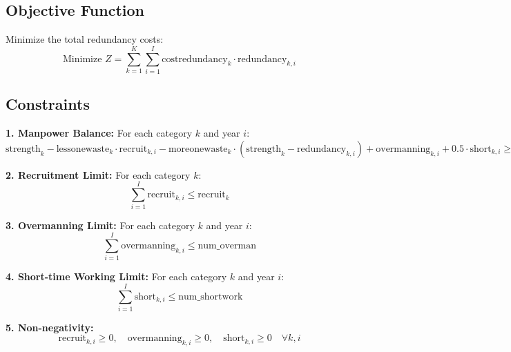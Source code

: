 \documentclass{article}
\begin{document}
\subsection*{Objective Function}
Minimize the total redundancy costs:
\[
\text{Minimize } Z = \sum_{k=1}^{K} \sum_{i=1}^{I} \text{costredundancy}_{k} \cdot \text{redundancy}_{k, i}
\]

\subsection*{Constraints}
\textbf{1. Manpower Balance:}
For each category $k$ and year $i$:
\[
\text{strength}_{k} - \text{lessonewaste}_{k} \cdot \text{recruit}_{k, i} - \text{moreonewaste}_{k} \cdot (\text{strength}_{k} - \text{redundancy}_{k, i}) + \text{overmanning}_{k, i} + 0.5 \cdot \text{short}_{k, i} \geq \text{requirement}_{k, i}
\]

\textbf{2. Recruitment Limit:}
For each category $k$:
\[
\sum_{i=1}^{I} \text{recruit}_{k, i} \leq \text{recruit}_{k}
\]

\textbf{3. Overmanning Limit:}
For each category $k$ and year $i$:
\[
\sum_{i=1}^{I} \text{overmanning}_{k, i} \leq \text{num\_overman}
\]

\textbf{4. Short-time Working Limit:}
For each category $k$ and year $i$:
\[
\sum_{i=1}^{I} \text{short}_{k, i} \leq \text{num\_shortwork}
\]

\textbf{5. Non-negativity:}
\[
\text{recruit}_{k, i} \geq 0, \quad \text{overmanning}_{k, i} \geq 0, \quad \text{short}_{k, i} \geq 0 \quad \forall k, i
\]
\end{document}
